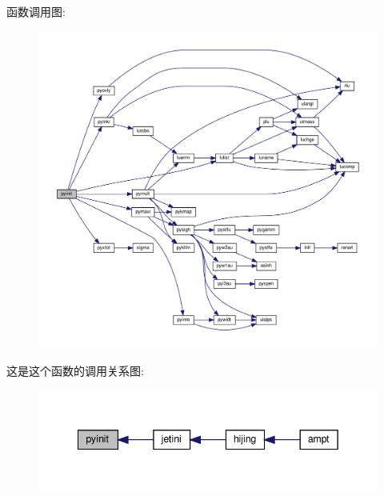 函数调用图\+:
\nopagebreak
\begin{figure}[H]
\begin{center}
\leavevmode
\includegraphics[width=350pt]{pyinit_8f90_a58e87874f7a28f80dcebe403c0572f3d_cgraph}
\end{center}
\end{figure}
这是这个函数的调用关系图\+:
\nopagebreak
\begin{figure}[H]
\begin{center}
\leavevmode
\includegraphics[width=342pt]{pyinit_8f90_a58e87874f7a28f80dcebe403c0572f3d_icgraph}
\end{center}
\end{figure}
